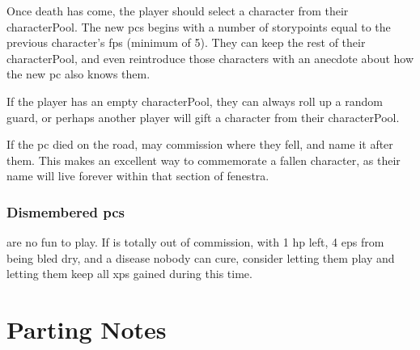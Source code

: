 \begin{multicols}{2}
Once death has come, the player should select a character from their \gls{characterPool}.
The new \glspl{pc} begins with a number of \glspl{storypoint} equal to the previous character's \glspl{fp} (minimum of 5).%
They can keep the rest of their \gls{characterPool}, and even reintroduce those characters with an anecdote about how the new \gls{pc} also knows them.

If the player has an empty \gls{characterPool}, they can always roll up a random \gls{guard}, or perhaps another player will gift a character from their \gls{characterPool}.

If the \gls{pc} died on the road,  may commission  where they fell, and name it after them.
This makes an excellent way to commemorate a fallen character, as their name will live forever within that section of \gls{fenestra}.

\subsubsection{Dismembered \Glspl{pc}}
are no fun to play.
If  is totally out of commission, with 1 \gls{hp} left, 4 \glspl{ep} from being bled dry, and a disease nobody can cure, consider letting them play  and letting them keep all \glspl{xp} gained during this time.

\end{multicols}

\section{Parting Notes}

